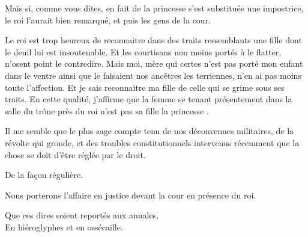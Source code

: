\begin{drama}
  \nobleTwospeaks Mais si, comme vous dites, en fait de la princesse \princesse{} s’est substituée une impostrice, le roi l’aurait bien remarqué, et puis les gens de la cour.

  \reinespeaks Le roi est trop heureux de reconnaitre dans des traits ressemblants  une fille dont le deuil lui est insoutenable. Et les courtisans non moins portés à le flatter, n’osent point le contredire. Mais moi, mère qui certes n’est pas porté mon enfant dans le ventre ainsi que le faisaient nos ancêtres les terriennes, n’en ai pas moins toute l’affection. Et je sais reconnaitre ma fille de celle qui se grime sous ses traits. En cette qualité, j’affirme que la femme se tenant présentement dans la salle du trône près du roi n’est pas sa fille la princesse \princesse{}.

  \nobleTreespeaks Il me semble que le plus sage compte tenu de nos déconvenues militaires, de la révolte qui gronde, et des troubles constitutionnels intervenus récemment que la chose se doit d’être réglée par le droit.

  \nobleOnespeaks De la façon régulière.

  \nobleTwospeaks Nous porterons l’affaire en justice devant la cour en présence du roi.

  \begin{minipage}[t]{\linewidth}
    Que ces dires soient reportés aux annales,\\
    En hiéroglyphes et en ossécaille.
  \end{minipage}

\end{drama}

\scene

\StageDirII{\roi, \reine, \nobleOne, \nobleTwo, \nobleTree, \ela, \vladimir, \huissier, \greffier}





